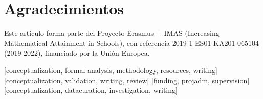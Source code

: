 \documentclass[spanish]{textolivre}
\begin{document}
\section{Agradecimientos}

Este artículo forma parte del Proyecto Erasmus + IMAS (Increasing Mathematical Attainment in Schools), con referencia 2019-1-ES01-KA201-065104 (2019-2022), financiado por la Unión Europea.

\printbibliography\label{sec-bib}


\begin{contributors}
[conceptualization, formal analysis, methodology, resources, writing]
[conceptualization, validation, writing, review]
[funding, projadm, supervision]
[conceptualization, datacuration, investigation, writing]
\end{contributors}
\end{document}
